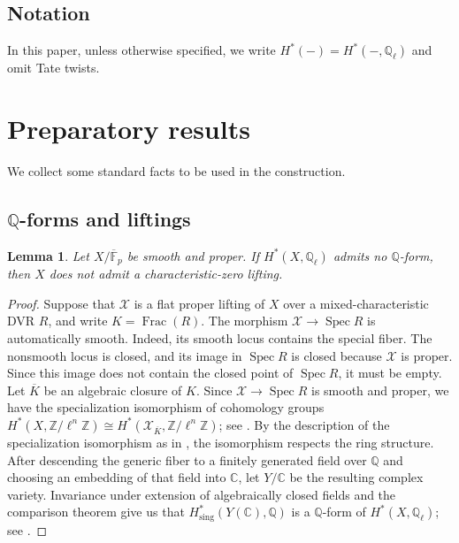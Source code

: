 \documentclass[11pt, reqno]{amsart}
\newtheorem{lemma}[theorem]{Lemma}
\theoremstyle{definition}
\newcommand\QQ{\mathbb{Q}}
\newcommand\CC{\mathbb{C}}
\newcommand\ZZ{\mathbb{Z}}
\newcommand\FF{\mathbb{F}}
\DeclareMathOperator{\et}{\acute{e}t}
\DeclareMathOperator{\Spec}{Spec}
\begin{document}
\subsection*{Notation}\;

In this paper, unless otherwise specified, we write $H^*(-)=H^*_{\et}(-,\QQ_\ell)$ and omit Tate twists.

\section{Preparatory results}\label{subsec: prep}

We collect some standard facts to be used in the construction. 

\subsection{$\QQ$-forms and liftings}
\label{subsubsec:Q-forms-and-liftings}
\;

\begin{lemma}
\label{lem:no-Q-form-obstructs-lifting}
Let $X/\overline{\FF}_p$ be smooth and proper.  If
$H^*_{\et}(X,\QQ_\ell)$ admits no $\QQ$-form, then $X$ does not admit a
characteristic-zero lifting.
\end{lemma}

\begin{proof}
Suppose that $\mathcal X$ is a flat proper lifting of $X$ over a
mixed-characteristic DVR $R$, and write $K=\operatorname{Frac}(R)$.
The morphism $\mathcal X\to\Spec R$ is automatically smooth.  Indeed,
its smooth locus contains the special fiber.  The nonsmooth locus is
closed, and its image in $\Spec R$ is closed because $\mathcal X$ is
proper.  Since this image does not contain the closed point of
$\Spec R$, it must be empty.
Let $\overline K$ be an algebraic closure of $K$.  Since $\mathcal X\to\Spec R$ is smooth and proper, we have the specialization isomorphism of cohomology groups
$H^*_{\et}(X,\ZZ/\ell^n\ZZ)
\cong
H^*_{\et}(\mathcal X_{\overline K},\ZZ/\ell^n\ZZ)$;
see \cite[VI, Corollary~4.2]{Milne-etale-cohomology}.
By the description of the specialization isomorphism as in \cite[\href{https://stacks.math.columbia.edu/tag/0GJ3}{Tag 0GJ3}]{stacks-project}, the isomorphism respects the ring structure.
After descending the generic fiber to a finitely generated field over
$\QQ$ and choosing an embedding of that field into $\CC$, let $Y/\CC$
be the resulting complex variety.  Invariance under extension of
algebraically closed fields and the comparison theorem give us that $H^*_{\mathrm{sing}}(Y(\CC),\QQ)$ is a $\QQ$-form of
$H^*_{\et}(X,\QQ_\ell)$; see
\cite[VI, Corollary~4.3 and III, Theorem~3.12]
{Milne-etale-cohomology}.
\end{proof}
\end{document}
